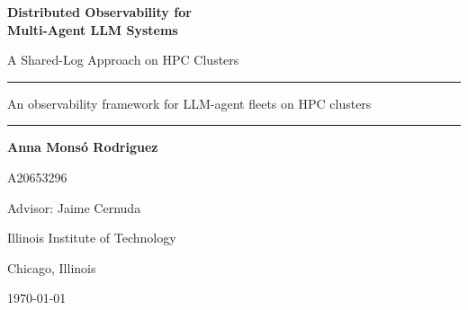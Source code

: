 \documentclass[11pt,a4paper]{report}
\begin{document}
\begin{titlepage}
\centering
{}

{\LARGE\bfseries Distributed Observability for\\[0.35em]
 Multi-Agent LLM Systems\par}

\vspace{0.9em}
{\large A Shared-Log Approach on HPC Clusters\par}

\vspace{1.6em}
\rule{0.62\linewidth}{0.4pt}\par
\vspace{1.1em}
{\small An observability framework for LLM-agent fleets on HPC clusters\par}
\vspace{1.1em}
\rule{0.62\linewidth}{0.4pt}\par


{\large\bfseries Anna Mons\'o Rodriguez\par}
\vspace{0.25em}
{\small A20653296\par}

\vspace{1.8em}
{\small Advisor: Jaime Cernuda\par}


{\large Illinois Institute of Technology\par}
\vspace{0.3em}
{\small Chicago, Illinois\par}
\vspace{1.2em}
{\small \today\par}

\end{titlepage}
\end{document}
